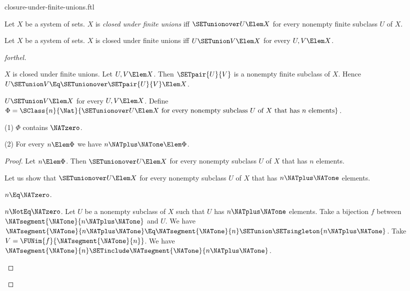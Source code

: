\documentclass{stex}
\begin{document}
\begin{smodule}{closure-under-finite-unions.ftl}

\begin{definition}[forthel,id=FOUNDATIONS_14_7040118193913856]
  Let $X$ be a system of sets.
  $X$ is \emph{closed under finite unions} iff $\SETunionover U \Elem X$ for every nonempty finite subclass $U$ of $X$.
\end{definition}

\begin{proposition}[forthel,id=FOUNDATIONS_17_4164024962908160]
  Let $X$ be a system of sets.
  $X$ is closed under finite unions iff $U \SETunion V \Elem X$ for every $U, V \Elem X$.
\end{proposition}
\begin{proof}[forthel]
  \begin{case}{$X$ is closed under finite unions.}
    Let $U, V \Elem X$.
    Then $\SETpair{U}{V}$ is a nonempty finite subclass of $X$.
    Hence $U \SETunion V \Eq \SETunionover \SETpair{U}{V} \Elem X$.
  \end{case}

  \begin{case}{$U \SETunion V \Elem X$ for every $U, V \Elem X$.}
    Define $\Phi = \SClass{n}{\Nat}{\SETunionover U \Elem X\text{ for every nonempty subclass }U\text{ of }X\text{ that has }n\text{ elements}}$.

    (1) $\Phi$ contains $\NATzero$.

    (2) For every $n \Elem \Phi$ we have $n \NATplus \NATone \Elem \Phi$.
    \begin{proof}
      Let $n \Elem \Phi$.
      Then $\SETunionover U \Elem X$ for every nonempty subclass $U$ of $X$ that has $n$ elements.

      Let us show that $\SETunionover U \Elem X$ for every nonempty subclass $U$ of $X$ that has $n \NATplus \NATone$ elements.

        \begin{case}{$n \Eq \NATzero$.} \end{case}

        \begin{case}{$n \NotEq \NATzero$.}
          Let $U$ be a nonempty subclass of $X$ such that $U$ has $n \NATplus \NATone$ elements.
          Take a bijection $f$ between $\NATsegment{\NATone}{n \NATplus \NATone}$ and $U$.
          We have $\NATsegment{\NATone}{n \NATplus \NATone} \Eq \NATsegment{\NATone}{n} \SETunion \SETsingleton{n \NATplus \NATone}$.
          Take $V = \FUNim{f}{\NATsegment{\NATone}{n}}$.
          We have $\NATsegment{\NATone}{n} \SETinclude \NATsegment{\NATone}{n \NATplus \NATone}$.


\end{case}
\end{proof}
\end{case}
\end{proof}
\end{smodule}
\end{document}
